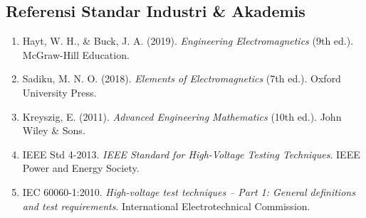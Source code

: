 \documentclass[11pt,a4paper]{article}
\theoremstyle{definition}
\begin{document}
\subsection{Referensi Standar Industri \& Akademis}
\begin{enumerate}[leftmargin=*]
    \item Hayt, W. H., \& Buck, J. A. (2019). \textit{Engineering Electromagnetics} (9th ed.). McGraw-Hill Education.
    \item Sadiku, M. N. O. (2018). \textit{Elements of Electromagnetics} (7th ed.). Oxford University Press.
    \item Kreyszig, E. (2011). \textit{Advanced Engineering Mathematics} (10th ed.). John Wiley \& Sons.
    \item IEEE Std 4-2013. \textit{IEEE Standard for High-Voltage Testing Techniques}. IEEE Power and Energy Society.
    \item IEC 60060-1:2010. \textit{High-voltage test techniques -- Part 1: General definitions and test requirements}. International Electrotechnical Commission.
\end{enumerate}
\end{document}
